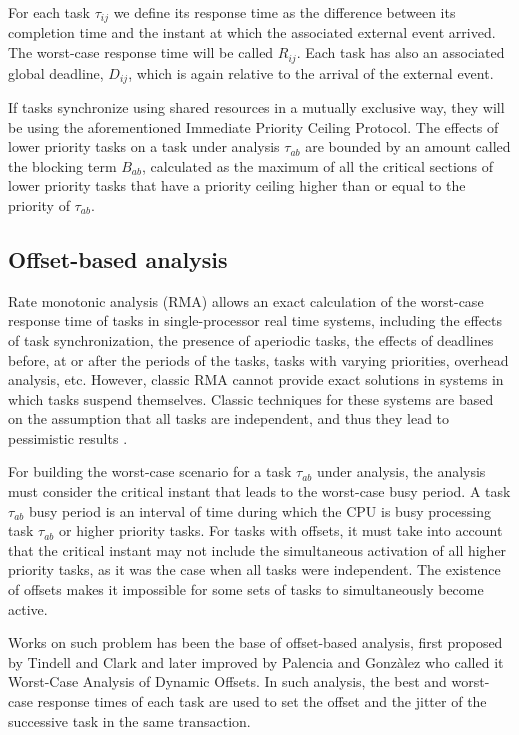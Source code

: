 \documentclass{article}
\begin{document}
For each task $\tau_{ij}$ we define its response time as the difference between its completion time and the instant at which the associated external event arrived. The worst-case response time will be called $R_{ij}$. Each task has also an associated global deadline, $D_{ij}$, which is again relative to the arrival of the external event.

If tasks synchronize using shared resources in a mutually exclusive way, they will be using the aforementioned Immediate Priority Ceiling Protocol. The effects of lower priority tasks on a task under analysis $\tau_{ab}$ are bounded by an amount called the blocking term $B_{ab}$, calculated as the maximum of all the critical sections of lower priority tasks that have a priority ceiling higher than or equal to the priority of $\tau_{ab}$.

\subsection{Offset-based analysis}

Rate monotonic analysis (RMA) \cite{rm-dm} allows an exact calculation of the worst-case response time of tasks in single-processor real time systems, including the effects of task synchronization, the presence of aperiodic tasks, the effects of deadlines before, at or after the periods of the tasks, tasks with varying priorities, overhead analysis, etc. However, classic RMA \cite{practitioner-common-data} cannot provide exact solutions in systems in which tasks suspend themselves. Classic techniques for these systems are based on the assumption that all tasks are independent, and thus they lead to pessimistic results \cite{pessimistic-rma}.

For building the worst-case scenario for a task $\tau_{ab}$ under analysis, the analysis must consider the critical instant that leads to the worst-case busy period. A task $\tau_{ab}$ busy period is an interval of time during which the CPU is busy processing task $\tau_{ab}$ or higher priority tasks. For tasks with offsets, it must take into account that the critical instant may not include the simultaneous activation of all higher priority tasks, as it was the case when all tasks were independent. The existence of offsets makes it impossible for some sets of tasks to simultaneously become active.

Works on such problem has been the base of offset-based analysis, first proposed by Tindell and Clark \cite{tindell-offsets} and later improved by Palencia and Gonzàlez \cite{pessimistic-rma} who called it Worst-Case Analysis of Dynamic Offsets. In such analysis, the best and worst-case response times of each task are used to set the offset and the jitter of the successive task in the same transaction.
\end{document}
